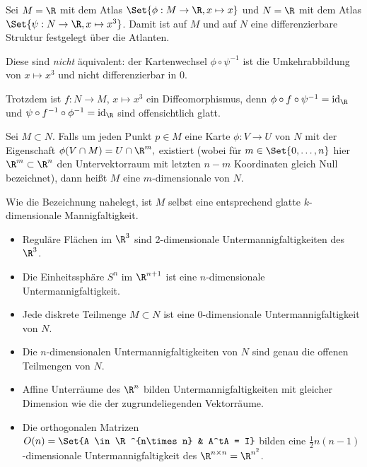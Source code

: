 \begin{ex*}
    Sei $M = \R$ mit dem Atlas $\Set{\phi: M \to \R, x \mapsto x}$ und $N = \R$ mit dem Atlas $\Set{\psi: N \to \R, x \mapsto x^3}$.
    Damit ist auf $M$ und auf $N$ eine differenzierbare Struktur festgelegt über die Atlanten.

    Diese sind \emph{nicht} äquivalent: der Kartenwechsel $\phi \circ \psi^{-1}$ ist die Umkehrabbildung von $x \mapsto x^3$ und nicht differenzierbar in $0$.

    Trotzdem ist $f: N \to M$, $x \mapsto x^3$ ein Diffeomorphismus, denn $\phi \circ f \circ \psi^{-1} = \id_\R$ und $\psi \circ f^{-1} \circ \phi^{-1} = \id_\R$ sind offensichtlich glatt.
\end{ex*}

\begin{df}[Untermannigfaltigkeit] \label{2.3}
    Sei $M \subset N$.
    Falls um jeden Punkt $p \in M$ eine Karte $\phi: V \to U$ von $N$ mit der
    Eigenschaft
    \begin{math}
        \phi(V \cap M) = U \cap \R^m,
    \end{math}
    existiert (wobei für $m \in \Set{0, \dotsc, n}$ hier $\R^m \subset \R^n$ den Untervektorraum mit letzten $n-m$ Koordinaten gleich Null bezeichnet), dann heißt $M$ eine $m$-dimensionale  von $N$.
    \begin{note}
        Wie die Bezeichnung nahelegt, ist $M$ selbst eine entsprechend glatte $k$-dimensionale Mannigfaltigkeit.
    \end{note}
\end{df}

\begin{ex*}
    \begin{itemize}
        \item
            Reguläre Flächen im $\R^3$ sind 2-dimensionale Untermannigfaltigkeiten des $\R^3$.
        \item
            Die Einheitssphäre $S^n$ im $\R^{n+1}$ ist eine $n$-dimensionale Untermannigfaltigkeit.
        \item
            Jede diskrete Teilmenge $M \subset N$ ist eine $0$-dimensionale Untermannigfaltigkeit von $N$.
        \item
            Die $n$-dimensionalen Untermannigfaltigkeiten von $N$ sind genau die offenen Teilmengen von $N$.
        \item
            Affine Unterräume des $\R^n$ bilden Untermannigfaltigkeiten mit gleicher Dimension wie die der zugrundeliegenden Vektorräume.
        \item
            Die orthogonalen Matrizen
            \begin{math}
                O(n) = \Set{A \in \R^{n\times n} & A^tA = I}
            \end{math}
            bilden eine $\frac{1}{2}n(n-1)$-dimensionale Untermannigfaltigkeit des $\R^{n\times n} = \R^{n^2}$.
    \end{itemize}
\end{ex*}

